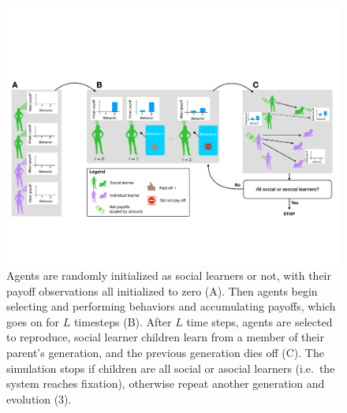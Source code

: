 \documentclass[letterpaper,11.5pt]{scrartcl}
\begin{document}

\clearpage

\begin{figure}
  \caption{Agents are randomly initialized as social learners or not, with their
  payoff observations all initialized to zero (A). Then agents begin selecting
and performing behaviors and accumulating payoffs, which goes on for $L$
timesteps (B). After $L$ time steps, agents are selected to reproduce,
social learner children learn from a member of their parent's generation, and
the previous generation dies off (C). The simulation stops if children are all
social or asocial learners (i.e.\ the system reaches fixation), 
otherwise repeat another generation and evolution (3).}
  \label{fig:schematic}
  \centering
    \includegraphics[width=\textwidth]{Figures/IntraInterGenerationalDynamics.pdf}
\end{figure}
\end{document}
